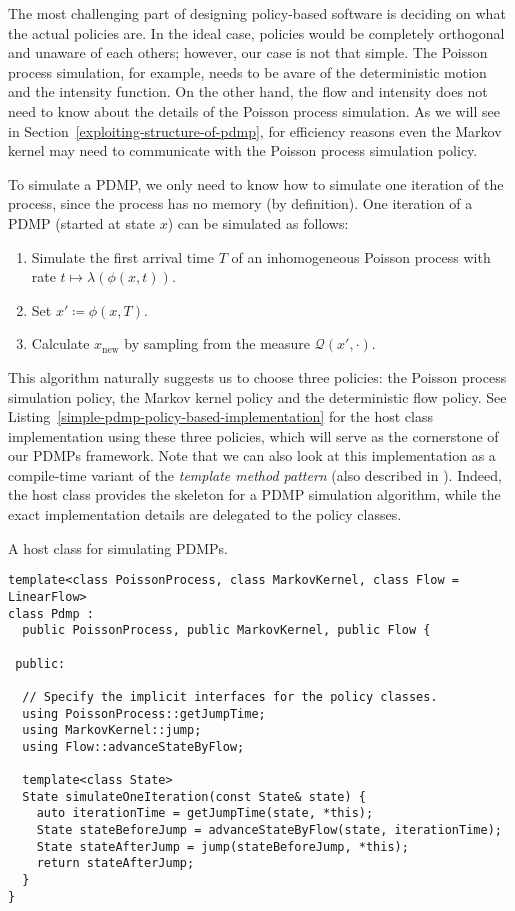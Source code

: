 \documentclass[report.tex]{subfiles}
\begin{document}
The most challenging part of designing policy-based software is deciding on
what the actual policies are.
In the ideal case, policies would be completely orthogonal and unaware of each
others; however, our case is not that simple.
The Poisson process simulation, for example, needs to be avare of the deterministic
motion and the intensity function. On the other hand, the flow and intensity does
not need to know about the details of the Poisson process simulation.
As we will see in Section~\ref{exploiting-structure-of-pdmp}, for efficiency
reasons even the Markov kernel may need to communicate with the Poisson process simulation
policy.

To simulate a PDMP, we only need to know how to simulate one iteration of the process,
since the process has no memory (by definition).
One iteration of a PDMP (started at state $x$) can be simulated as follows:
\begin{enumerate}
  \item Simulate the first arrival time $T$ of an inhomogeneous Poisson process with
        rate \mbox{$t \mapsto \lambda(\phi(x, t))$}.
  \item Set $x' \coloneqq \phi(x, T)$.
  \item Calculate $x_{\text{new}}$ by sampling from the measure $\mathcal{Q}(x', \cdot)$.
\end{enumerate}
This algorithm naturally suggests us to choose three policies: the Poisson process simulation policy,
the Markov kernel policy and the deterministic flow policy.
See Listing~\ref{simple-pdmp-policy-based-implementation}
for the host class implementation using these three policies, which will serve as the
cornerstone of our PDMPs framework.
Note that we can also look at this implementation as a compile-time variant of the
\textit{template method pattern} (also described in \cite{gamma1994design}).
Indeed, the host class provides the skeleton for a PDMP simulation algorithm,
while the exact implementation details are delegated to the policy classes.

\begin{lstfloat}
\caption{A host class for simulating PDMPs.}
\label{simple-pdmp-policy-based-implementation}
\begin{lstlisting}
template<class PoissonProcess, class MarkovKernel, class Flow = LinearFlow>
class Pdmp :
  public PoissonProcess, public MarkovKernel, public Flow {

 public:

  // Specify the implicit interfaces for the policy classes.
  using PoissonProcess::getJumpTime;
  using MarkovKernel::jump;
  using Flow::advanceStateByFlow;

  template<class State>
  State simulateOneIteration(const State& state) {
    auto iterationTime = getJumpTime(state, *this);
    State stateBeforeJump = advanceStateByFlow(state, iterationTime);
    State stateAfterJump = jump(stateBeforeJump, *this);
    return stateAfterJump;
  }
}
\end{lstlisting}
\end{lstfloat}
\end{document}
